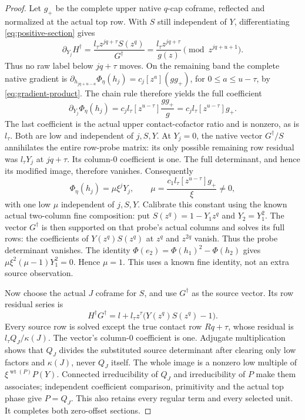 \documentclass[11pt,a4paper]{amsart}
\numberwithin{equation}{section}
\theoremstyle{plain}
\theoremstyle{definition}
\newcommand{\wt}{\operatorname{wt}}
\begin{document}
\begin{proof}
Let \(g_+\) be the complete upper native \(q\)-cap coframe, reflected and
normalized at the actual top row.  With \(S\) still independent of \(Y\),
differentiating \eqref{eq:positive-section} gives
\[
 \partial_{Y_j}H^\dagger
 =\frac{l_\tau z^{jq+\tau}S(z^q)}{G^\dagger}
 =\frac{l_\tau z^{jq+\tau}}{g(z)}
       \pmod {z^{jq+u+1}}.
\]
Thus no raw label below \(jq+\tau\) moves.  On the remaining band the
complete native gradient is
\(\partial_{h_{jq+u-a}}\Phi_\eta(h_j)=c_j[z^a](g g_+)\),
for \(0\le a\le u-\tau\), by \eqref{eq:gradient-product}.
The chain rule therefore yields the full coefficient
\[
 \partial_{Y_j}\Phi_\eta(h_j)
 =c_jl_\tau[z^{u-\tau}]\frac{g g_+}{g}
 =c_jl_\tau[z^{u-\tau}]g_+.
\]
The last coefficient is the actual upper contact-cofactor ratio and is
nonzero, as is \(l_\tau\).  Both are low and independent of \(j,S,Y\).
At \(Y_j=0\), the native vector \(G^\dagger/S\) annihilates the entire
row-probe matrix: its only possible remaining row residual was
\(l_\tau Y_j\) at \(jq+\tau\).  Its column-\(0\) coefficient is one.
The full determinant, and hence its modified image, therefore vanishes.
Consequently
\[
 \Phi_\eta(h_j)=\mu\xi^jY_j,\qquad
 \mu=\frac{c_1l_\tau[z^{u-\tau}]g_+}{\xi}\ne0,
\]
with one low \(\mu\) independent of \(j,S,Y\).
Calibrate this constant using the known actual two-column fine composition:
put \(S(z^q)=1-Y_1z^q\) and \(Y_2=Y_1^2\).  The vector \(G^\dagger\)
is then supported on that probe's actual columns and solves its full rows:
the coefficients of \(Y(z^q)S(z^q)\) at \(z^q\) and \(z^{2q}\) vanish.
Thus the probe determinant vanishes.  The identity \(\Phi(e_2)=\Phi(h_1)^2-\Phi(h_2)\) gives
\(\mu\xi^2(\mu-1)Y_1^2=0\).  Hence \(\mu=1\).
This uses a known fine identity, not an extra source observation.

Now choose the actual \(J\) coframe for \(S\), and use \(G^\dagger\)
as the source vector.  Its row residual series is
\[
 H^\dagger G^\dagger
   =l+l_\tau z^\tau\bigl(Y(z^q)S(z^q)-1\bigr).
\]
Every source row is solved
except the true contact row \(Rq+\tau\), whose residual is
\(l_\tau Q_J/\kappa(J)\).  The vector's column-\(0\) coefficient is one.
Adjugate multiplication shows that \(Q_J\) divides the substituted source
determinant after clearing only low factors and \(\kappa(J)\), never
\(Q_J\) itself.  The whole image is a nonzero low multiple of
\(\xi^{\wt(P)}P(Y)\).  Connected irreducibility of \(Q_J\) and irreducibility
of \(P\) make them associates; independent coefficient comparison,
primitivity and the actual top phase give \(P=Q_J\).  This also retains every
regular term and every selected unit.  It completes both zero-offset
sections.
\end{proof}
\end{document}
